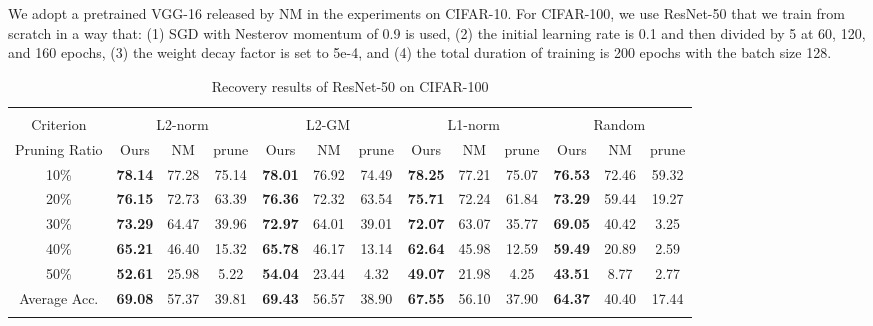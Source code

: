 We adopt a pretrained VGG-16 released by NM \cite{NM} in the experiments on CIFAR-10. For CIFAR-100, we use ResNet-50 \cite{ResNet} that we train from scratch in a way that:
(1) SGD with Nesterov momentum of 0.9 is used, (2) the initial learning rate is 0.1 and then divided by 5 at 60, 120, and 160 epochs, (3) the weight decay factor is set to 5e-4, and (4) the total duration of training is 200 epochs with the batch size 128.

\begin{table}[htb!]
\centering 
{\scriptsize
\begin{tabular}{c||c|c|c||c|c|c||c|c|c||c|c|c}  \Xhline{2\arrayrulewidth}
\multicolumn{13}{c}{\textbf{ResNet-50 (Acc. 78.82) }}
\\ \Xhline{2\arrayrulewidth} %
Criterion & \multicolumn{3}{c||}{L2-norm} & \multicolumn{3}{c||}{L2-GM} & \multicolumn{3}{c||}{L1-norm}& \multicolumn{3}{c}{Random}\\ \hline
Pruning Ratio& Ours& NM& prune& Ours& NM& prune& Ours& NM& prune& Ours& NM& prune
\\ \Xhline{2\arrayrulewidth}
10\%& \textbf{78.14} & 77.28 & 75.14 & \textbf{78.01} & 76.92 & 74.49 & \textbf{78.25} & 77.21 & 75.07 & \textbf{76.53} & 72.46 & 59.32 \\ \hline
20\%& \textbf{76.15} & 72.73 & 63.39 & \textbf{76.36} & 72.32 & 63.54 & \textbf{75.71} & 72.24 & 61.84 & \textbf{73.29} & 59.44 & 19.27 \\ \hline
30\%& \textbf{73.29} & 64.47 & 39.96 & \textbf{72.97} & 64.01 & 39.01 & \textbf{72.07} & 63.07 & 35.77 & \textbf{69.05} & 40.42 & 3.25  \\ \hline
40\%& \textbf{65.21} & 46.40 & 15.32 & \textbf{65.78} & 46.17 & 13.14 & \textbf{62.64} & 45.98 & 12.59 & \textbf{59.49} & 20.89 & 2.59  \\ \hline
50\%& \textbf{52.61} & 25.98 & 5.22  & \textbf{54.04} & 23.44 & 4.32  & \textbf{49.07} & 21.98 & 4.25  & \textbf{43.51} & 8.77  & 2.77  \\ \Xhline{2\arrayrulewidth}
Average Acc. & \textbf{69.08} & 57.37 & 39.81 & \textbf{69.43} & 56.57 & 38.90 & \textbf{67.55} & 56.10 & 37.90 & \textbf{64.37} & 40.40 & 17.44\\ \Xhline{2\arrayrulewidth}   
\end{tabular}%
}
\caption{Recovery results of ResNet-50 on CIFAR-100}
\label{tab:ResNet50-CIFAR100}
\vspace{2mm}


\end{table}
